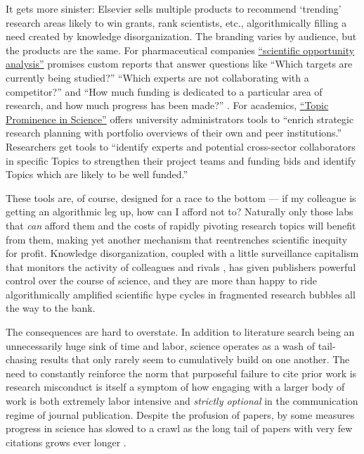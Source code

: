 \documentclass[notoc]{tufte-book}
\begin{document}
It gets more sinister: Elsevier sells multiple products to recommend
`trending' research areas likely to win grants, rank scientists, etc.,
algorithmically filling a need created by knowledge disorganization. The
branding varies by audience, but the products are the same. For
pharmaceutical companies
\href{https://www.elsevier.com/solutions/professional-services/drug-design-optimization\#opportunity}{``scientific
opportunity analysis''} promises custom reports that answer questions
like ``Which targets are currently being studied?'' ``Which experts are
not collaborating with a competitor?'' and ``How much funding is
dedicated to a particular area of research, and how much progress has
been made?'' \citep{elsevierDrugDesignOptimization} . For
academics,
\href{https://www.elsevier.com/solutions/scival/features/topic-prominence-in-science\#how}{``Topic
Prominence in Science''} offers university administrators tools to
``enrich strategic research planning with portfolio overviews of their
own and peer institutions.'' Researchers get tools to ``identify experts
and potential cross-sector collaborators in specific Topics to
strengthen their project teams and funding bids and identify Topics
which are likely to be well funded.'' \citep{elsevierTopicProminenceScienceb} 

These tools are, of course, designed for a race to the bottom --- if my
colleague is getting an algorithmic leg up, how can I afford not to?
Naturally only those labs that \emph{can} afford them and the costs of
rapidly pivoting research topics will benefit from them, making yet
another mechanism that reentrenches scientific inequity for profit.
Knowledge disorganization, coupled with a little surveillance capitalism
that monitors the activity of colleagues and rivals \citep{brembsReplacingAcademicJournals2021} , has given publishers powerful
control over the course of science, and they are more than happy to ride
algorithmically amplified scientific hype cycles in fragmented research
bubbles all the way to the bank.

The consequences are hard to overstate. In addition to literature search
being an unnecessarily huge sink of time and labor, science operates as
a wash of tail-chasing results that only rarely seem to cumulatively
build on one another. The need to constantly reinforce the norm that
purposeful failure to cite prior work is research misconduct is itself a
symptom of how engaging with a larger body of work is both extremely
labor intensive and \emph{strictly optional} in the communication regime
of journal publication. Despite the profusion of papers, by some
measures progress in science has slowed to a crawl as the long tail of
papers with very few citations grows ever longer \citep{chuSlowedCanonicalProgress2021} .
\end{document}
